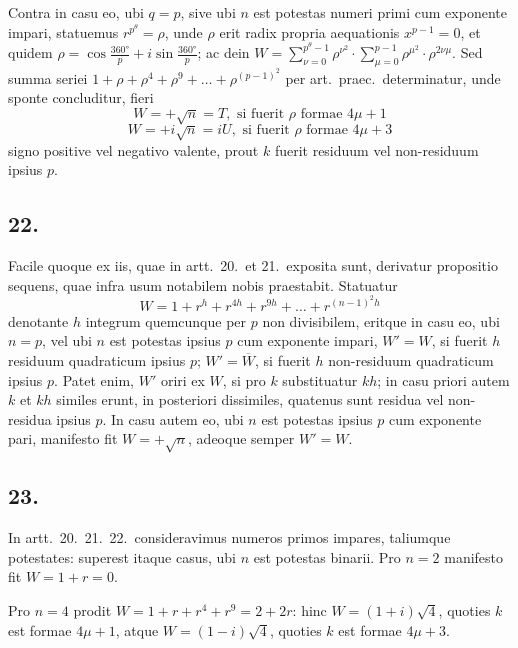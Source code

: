 \documentclass[12pt,a4paper]{article}
\theoremstyle{plain}
\begin{document}
Contra in casu eo, ubi $q = p$, sive ubi $n$ est potestas numeri primi cum exponente impari, statuemus $r^{p^{\theta}} = \rho$, unde $\rho$ erit radix propria aequationis $x^{p-1} = 0$, et quidem $\rho = \cos \frac{360°}{p} + i \sin \frac{360°}{p}$; ac dein $W = \sum_{\nu=0}^{p^{\theta}-1} \rho^{\nu^2} \cdot \sum_{\mu=0}^{p-1} \rho^{\mu^2} \cdot \rho^{2\nu \mu}$. Sed summa seriei $1 + \rho + \rho^4 + \rho^9 + \ldots + \rho^{(p-1)^2}$ per art.\ praec.\ determinatur, unde sponte concluditur, fieri
\[
W = +\sqrt{n} = T, \text{ si fuerit } \rho \text{ formae } 4\mu+1
\]
\[
W = +i\sqrt{n} = iU, \text{ si fuerit } \rho \text{ formae } 4\mu+3
\]
signo positive vel negativo valente, prout $k$ fuerit residuum vel non-residuum ipsius $p$.

\subsection*{22.}

Facile quoque ex iis, quae in artt.\ 20.\ et 21.\ exposita sunt, derivatur propositio sequens, quae infra usum notabilem nobis praestabit. Statuatur
\[
W = 1 + r^{h} + r^{4h} + r^{9h} + \ldots + r^{(n-1)^2 h}
\]
denotante $h$ integrum quemcunque per $p$ non divisibilem, eritque in casu eo, ubi $n = p$, vel ubi $n$ est potestas ipsius $p$ cum exponente impari, $W' = W$, si fuerit $h$ residuum quadraticum ipsius $p$; $W' = \overline{W}$, si fuerit $h$ non-residuum quadraticum ipsius $p$. Patet enim, $W'$ oriri ex $W$, si pro $k$ substituatur $kh$; in casu priori autem $k$ et $kh$ similes erunt, in posteriori dissimiles, quatenus sunt residua vel non-residua ipsius $p$. In casu autem eo, ubi $n$ est potestas ipsius $p$ cum exponente pari, manifesto fit $W = +\sqrt{n}$, adeoque semper $W' = W$.

\subsection*{23.}

In artt.\ 20.\ 21.\ 22.\ consideravimus numeros primos impares, taliumque potestates: superest itaque casus, ubi $n$ est potestas binarii. Pro $n = 2$ manifesto fit $W = 1 + r = 0$.

Pro $n = 4$ prodit $W = 1 + r + r^4 + r^9 = 2 + 2r$: hinc $W = (1+i)\sqrt{4}$, quoties $k$ est formae $4\mu+1$, atque $W = (1-i)\sqrt{4}$, quoties $k$ est formae $4\mu+3$.
\end{document}
